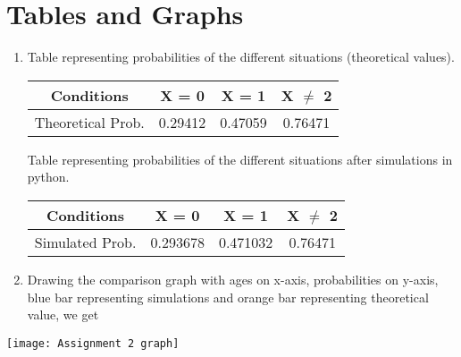 \documentclass[journal,12pt,twocolumn]{IEEEtran}
\begin{document}
\section* {Tables and Graphs} 
\begin{enumerate}
\item Table representing probabilities of the different situations (theoretical values).
\begin{center}
    \begin{tabular}{|c|c|c|c|}
    \hline
    {Conditions} & X = 0    & X = 1    & X $\ne$ 2    \\
    \hline
    {Theoretical Prob.} & 0.29412 & 0.47059 & 0.76471 \\
    \hline
    \end{tabular}
\end{center}

Table representing probabilities of the different situations after simulations in python.
\begin{center}
    \begin{tabular}{|c|c|c|c|}
    \hline
    {Conditions} & X = 0    & X = 1    & X $\ne$ 2    \\
    \hline
    {Simulated Prob.} & 0.293678 & 0.471032 & 0.76471 \\
    \hline
    \end{tabular}
\end{center}

\item Drawing the comparison graph with ages on x-axis, probabilities on y-axis, blue bar representing simulations and orange bar representing theoretical value, we get
\end{enumerate}
\texttt{[image: Assignment 2 graph]}
\end{document}
